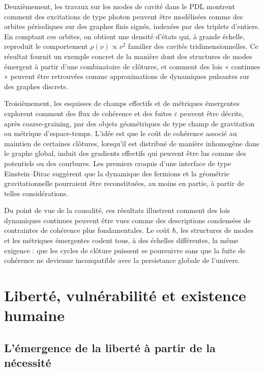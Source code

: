 \documentclass[11pt,a4paper]{article}
\theoremstyle{definition}
\begin{document}
Deuxièmement, les travaux sur les modes de cavité dans le PDL montrent comment des excitations de type photon peuvent être modélisées comme des orbites périodiques sur des graphes finis signés, indexées par des triplets d’entiers.\cite{Laubscher_CavityModes_PDL_2024} En comptant ces orbites, on obtient une densité d’états qui, à grande échelle, reproduit le comportement \( \rho(\nu) \propto \nu^2 \) familier des cavités tridimensionnelles. Ce résultat fournit un exemple concret de la manière dont des structures de modes émergent à partir d’une combinatoire de clôtures, et comment des lois « continues » peuvent être retrouvées comme approximations de dynamiques pulsantes sur des graphes discrets.

Troisièmement, les esquisses de champs effectifs et de métriques émergentes explorent comment des flux de cohérence et des fuites \(\varepsilon\) peuvent être décrits, après coarse-graining, par des objets géométriques de type champ de gravitation ou métrique d’espace-temps.\cite{Laubscher_EffectiveFields_2024,Laubscher_Einstein_Dirac_2024} L’idée est que le coût de cohérence associé au maintien de certaines clôtures, lorsqu’il est distribué de manière inhomogène dans le graphe global, induit des gradients effectifs qui peuvent être lus comme des potentiels ou des courbures. Les premiers croquis d’une interface de type Einstein–Dirac suggèrent que la dynamique des fermions et la géométrie gravitationnelle pourraient être reconstituées, au moins en partie, à partir de telles considérations.

Du point de vue de la causalité, ces résultats illustrent comment des lois dynamiques continues peuvent être vues comme des descriptions condensées de contraintes de cohérence plus fondamentales. Le coût \(\hbar\), les structures de modes et les métriques émergentes codent tous, à des échelles différentes, la même exigence : que les cycles de clôture puissent se poursuivre sans que la fuite de cohérence ne devienne incompatible avec la persistance globale de l’univers.\cite{Laubscher_EmergencePhysicalReality_2024,Laubscher_PDL_GlobalMapping_v6_2024}

\section{Liberté, vulnérabilité et existence humaine}
\label{sec:freedom_human}

\subsection{L'émergence de la liberté à partir de la nécessité}
\end{document}
